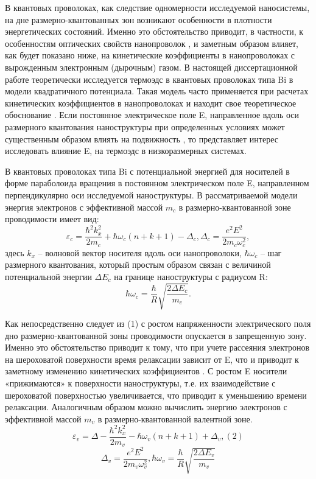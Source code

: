 В квантовых проволоках, как следствие одномерности исследуемой наносистемы, на дне размерно-квантованных зон возникают особенности в плотности энергетических состояний. Именно это обстоятельство приводит, в частности, к особенностям оптических свойств нанопроволок \cite{Black2003a,Black2000,Black2002,Levin2009a}, и заметным образом влияет, как будет показано ниже, на кинетические коэффициенты в нанопроволоках с вырожденным электронным (дырочным) газом. В настоящей диссертационной работе теоретически исследуется термоэдс в квантовых проволоках типа Bi в модели квадратичного потенциала. Такая модель часто применяется при расчетах кинетических коэффициентов в нанопроволоках \cite{Geiler1998,Geiler1999} и находит свое теоретическое обоснование \cite{Beenakker1991}. Если постоянное электрическое поле E, направленное вдоль оси размерного квантования наноструктуры при определенных условиях может существенным образом влиять на подвижность \cite{Karapetyan2011}, то представляет интерес исследовать влияние E, на термоэдс в низкоразмерных системах.
 
В квантовых проволоках типа Bi с потенциальной энергией для носителей в форме параболоида вращения в постоянном электрическом поле E, направленном перпендикулярно оси исследуемой наноструктуры. В рассматриваемой модели энергия электронов с эффективной массой $m_{c} $ в размерно-квантованной зоне проводимости имеет вид:
\begin{equation} \label{eq:44_10}
\varepsilon _{c} =\frac{\hbar ^{2} k_{x}^{2} }{2m_{c} } +\hbar \omega _{c} \left(n+k+1\right)-\Delta _{c} , \Delta _{c} =\frac{e^{2} E^{2} }{2m_{c} \omega _{c}^{2} } , 
\end{equation} 
здесь $k_{x} $ -- волновой вектор носителя вдоль оси нанопроволоки, $\hbar \omega _{c} $ -- шаг размерного квантования, который простым образом связан с величиной потенциальной энергии $\Delta E_{c} $ на границе наноструктуры с радиусом R:
\[
\hbar \omega _{c} =\frac{\hbar }{R} \sqrt{\frac{2\Delta E_{c} }{m_{c} } } .
\] 

Как непосредственно следует из (1) с ростом напряженности электрического поля дно размерно-квантованной зоны проводимости опускается в запрещенную зону. Именно это обстоятельство приводит к тому, что при учете рассеяния электронов на шероховатой поверхности время релаксации зависит от E, что и приводит к заметному изменению кинетических коэффициентов \cite{Karapetyan2011}. С ростом E носители «прижимаются» к поверхности наноструктуры, т.е. их взаимодействие с шероховатой поверхностью увеличивается, что приводит к уменьшению времени релаксации. Аналогичным образом можно вычислить энергию электронов с эффективной массой $m_{v} $ в размерно-квантованной валентной зоне.
\begin{equation} \label{eq:44_20}
\varepsilon _{v} =\Delta -\frac{\hbar ^{2} k_{x}^{2} }{2m_{v} } -\hbar \omega _{v} \left(n+k+1\right)+\Delta _{v} , (2)
\end{equation} 
\[
\Delta _{v} =\frac{e^{2} E^{2} }{2m_{v} \omega _{v}^{2} } , \hbar \omega _{v} =\frac{\hbar }{R} \sqrt{\frac{2\Delta E_{v} }{m_{v} } } 
\] 


